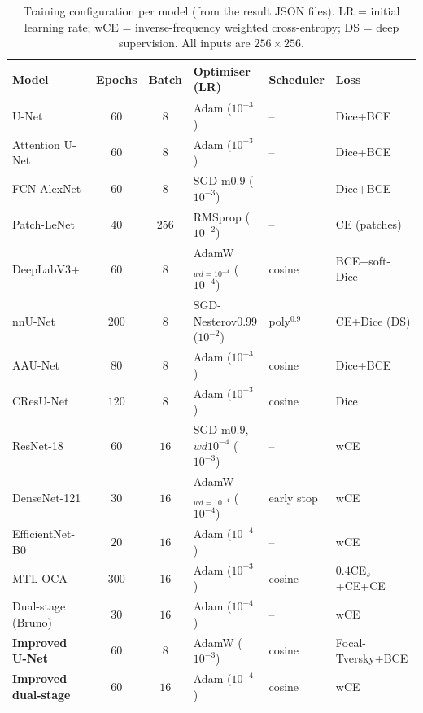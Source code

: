 \documentclass[11pt]{article}
\begin{document}
\begin{table}[t]
\centering
\caption{Training configuration per model (from the result JSON files). LR = initial
learning rate; wCE = inverse-frequency weighted cross-entropy; DS = deep
supervision. All inputs are $256\times256$.}
\label{tab:hparams}
\scriptsize
\begin{tabularx}{\linewidth}{@{}l c c l l l@{}}
\toprule
Model & Epochs & Batch & Optimiser (LR) & Scheduler & Loss \\
\midrule
U-Net                & $60$  & $8$  & Adam ($10^{-3}$)               & --           & Dice+BCE \\
Attention U-Net      & $60$  & $8$  & Adam ($10^{-3}$)               & --           & Dice+BCE \\
FCN-AlexNet          & $60$  & $8$  & SGD-m$0.9$ ($10^{-3}$)         & --           & Dice+BCE \\
Patch-LeNet          & $40$  & $256$& RMSprop ($10^{-2}$)            & --           & CE (patches) \\
DeepLabV3+           & $60$  & $8$  & AdamW$_{wd=10^{-4}}$ ($10^{-4}$)& cosine      & BCE+soft-Dice \\
nnU-Net              & $200$ & $8$  & SGD-Nesterov$0.99$ ($10^{-2}$) & poly$^{0.9}$ & CE+Dice (DS) \\
AAU-Net              & $80$  & $8$  & Adam ($10^{-3}$)               & cosine       & Dice+BCE \\
CResU-Net            & $120$ & $8$  & Adam ($10^{-3}$)               & cosine       & Dice \\
ResNet-18            & $60$  & $16$ & SGD-m$0.9$,$wd10^{-4}$ ($10^{-3}$)& --         & wCE \\
DenseNet-121         & $30$  & $16$ & AdamW$_{wd=10^{-4}}$ ($10^{-4}$)& early stop   & wCE \\
EfficientNet-B0      & $20$  & $16$ & Adam ($10^{-4}$)               & --           & wCE \\
MTL-OCA              & $300$ & $16$ & Adam ($10^{-3}$)               & cosine       & $0.4$CE$_s$+CE+CE \\
Dual-stage (Bruno)   & $30$  & $16$ & Adam ($10^{-4}$)               & --           & wCE \\
\textbf{Improved U-Net} & $60$ & $8$ & AdamW ($10^{-3}$)            & cosine       & Focal-Tversky+BCE \\
\textbf{Improved dual-stage} & $60$ & $16$ & Adam ($10^{-4}$)      & cosine       & wCE \\
\bottomrule
\end{tabularx}
\end{table}
\end{document}
